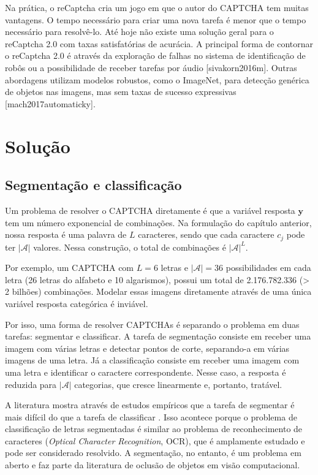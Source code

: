 \documentclass[12pt,]{report}
\begin{document}
Na prática, o reCaptcha cria um jogo em que o autor do CAPTCHA tem
muitas vantagens. O tempo necessário para criar uma nova tarefa é menor
que o tempo necessário para resolvê-lo. Até hoje não existe uma solução
geral para o reCaptcha 2.0 com taxas satisfatórias de acurácia. A
principal forma de contornar o reCaptcha 2.0 é através da exploração de
falhas no sistema de identificação de robôs ou a possibilidade de
receber tarefas por áudio {[}sivakorn2016m{]}. Outras abordagens
utilizam modelos robustos, como o ImageNet, para detecção genérica de
objetos nas imagens, mas sem taxas de sucesso expressivas
{[}mach2017automaticky{]}.

\chapter{Solução}\label{results}

\section{Segmentação e classificação}\label{segmentacao-e-classificacao}

Um problema de resolver o CAPTCHA diretamente é que a variável resposta
\(\mathbf y\) tem um número exponencial de combinações. Na formulação do
capítulo anterior, nossa resposta é uma palavra de \(L\) caracteres,
sendo que cada caractere \(c_j\) pode ter \(|\mathcal A|\) valores.
Nessa construção, o total de combinações é \(|\mathcal A|^L\).

Por exemplo, um CAPTCHA com \(L=6\) letras e \(|\mathcal A| = 36\)
possibilidades em cada letra (26 letras do alfabeto e 10 algarismos),
possui um total de 2.176.782.336 (\textgreater{} 2 bilhões) combinações.
Modelar essas imagens diretamente através de uma única variável resposta
categórica é inviável.

Por isso, uma forma de resolver CAPTCHAs é separando o problema em duas
tarefas: segmentar e classificar. A tarefa de segmentação consiste em
receber uma imagem com várias letras e detectar pontos de corte,
separando-a em várias imagens de uma letra. Já a classificação consiste
em receber uma imagem com uma letra e identificar o caractere
correspondente. Nesse caso, a resposta é reduzida para \(|\mathcal A|\)
categorias, que cresce linearmente e, portanto, tratável.

A literatura mostra através de estudos empíricos que a tarefa de
segmentar é mais difícil do que a tarefa de classificar
\citep{bursztein2014end}. Isso acontece porque o problema de
classificação de letras segmentadas é similar ao problema de
reconhecimento de caracteres (\emph{Optical Character Recognition},
OCR), que é amplamente estudado e pode ser considerado resolvido. A
segmentação, no entanto, é um problema em aberto e faz parte da
literatura de oclusão de objetos em visão computacional.
\end{document}

